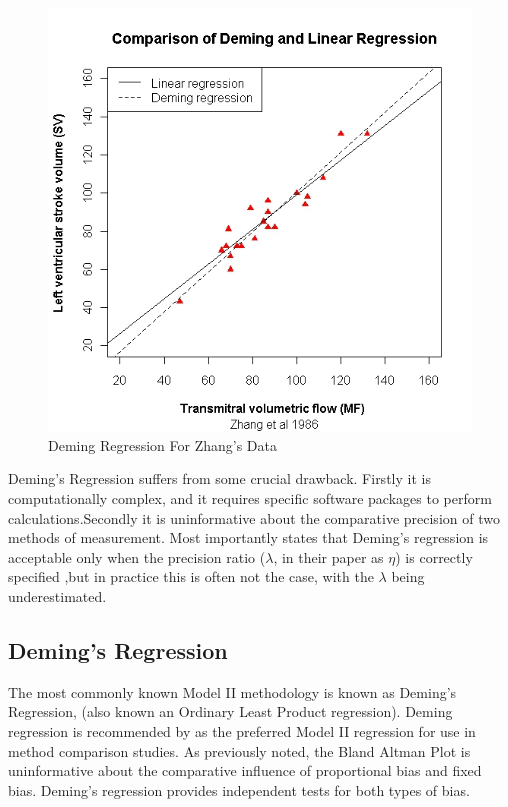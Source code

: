 \documentclass[MAIN.tex]{subfiles}
\begin{document}
	\begin{figure}[h!]
		\includegraphics[width=130mm]{images/ZhangDeming.jpeg}
		\caption{Deming Regression For Zhang's Data}\label{ZhangDeming}
	\end{figure}
	
	Deming's Regression suffers from some crucial drawback. Firstly it
	is computationally complex, and it requires specific software
	packages to perform calculations.Secondly it is uninformative
	about the comparative precision of two methods of measurement.
	Most importantly \citet{CarollRupert} states that Deming's
	regression is acceptable only when the precision ratio ($\lambda$,
	in their paper as $\eta$) is correctly specified ,but in practice
	this is often not the case, with the $\lambda$ being
	underestimated.

	\subsection{Deming's Regression}
	The most commonly known Model II methodology is known as Deming's
	Regression, (also known an Ordinary Least Product regression).
	Deming regression is recommended by \citet*{CornCoch} as the
	preferred Model II regression for use in method comparison
	studies. As previously noted, the Bland Altman Plot is
	uninformative about the comparative influence of proportional bias
	and fixed bias. Deming's regression provides independent tests for
	both types of bias.
	
\end{document}
